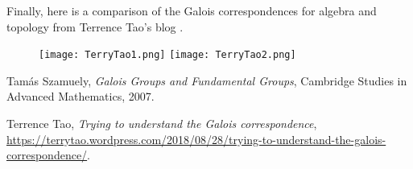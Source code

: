 \begin{remark}
  Finally, here is a comparison of the Galois correspondences for algebra and topology from Terrence Tao's blog \cite{TerrenceTao}.
  \begin{figure}[H]
  \centering
    \texttt{[image: TerryTao1.png]}
    \texttt{[image: TerryTao2.png]}
  \end{figure}

\end{remark}

\begin{thebibliography}{9}
Tam\'as Szamuely, \emph{Galois Groups and Fundamental Groups}, Cambridge Studies in Advanced Mathematics, 2007.

Terrence Tao, \emph{Trying to understand the Galois correspondence},\\ \url{https://terrytao.wordpress.com/2018/08/28/trying-to-understand-the-galois-correspondence/}.
\end{thebibliography}


%
%
%
